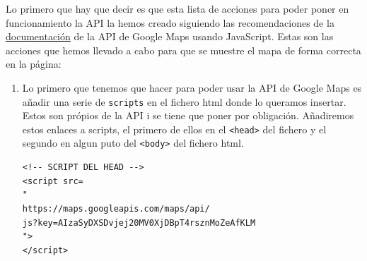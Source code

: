 \documentclass{article}
\begin{document}
\noindent Lo primero que hay que decir es que esta lista de acciones para poder poner en funcionamiento la API la hemos creado siguiendo las recomendaciones de la \href{https://developers.google.com/maps/documentation/javascript?hl=es-419}{documentación} de la API de Google Maps usando JavaScript. Estas son las acciones que hemos llevado a cabo para que se muestre el mapa de forma correcta en la página:
\begin{enumerate}
    \item Lo primero que tenemos que hacer para poder usar la API de Google Maps es añadir una serie de \texttt{scripts} en el fichero html donde lo queramos insertar. Estos son própios de la API i se tiene que poner por obligación. Añadiremos estos enlaces a scripts, el primero de ellos en el \texttt{<head>} del fichero y el segundo en algun puto del \texttt{<body>} del fichero html.
    \begin{verbatim}
<!-- SCRIPT DEL HEAD -->
<script src=
"
https://maps.googleapis.com/maps/api/
js?key=AIzaSyDXSDvjej20MV0XjDBpT4rsznMoZeAfKLM
">
</script>


\end{verbatim}
\end{enumerate}
\end{document}
